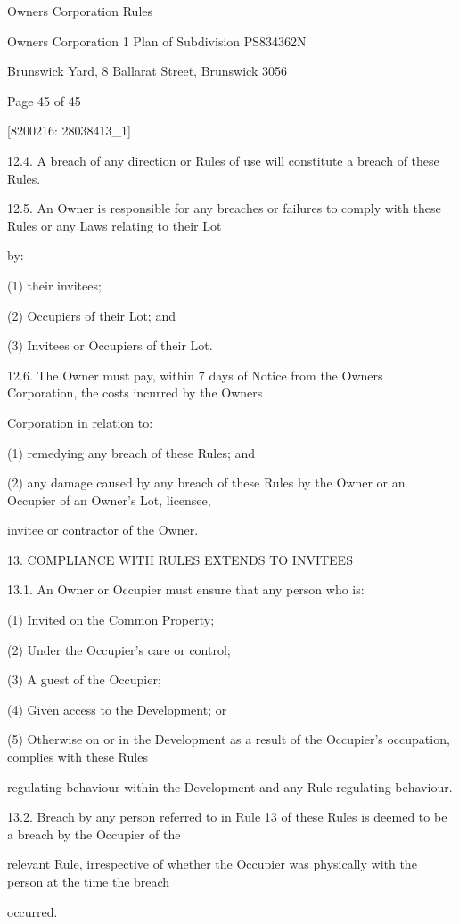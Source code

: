 \documentclass{article}
\begin{document}
{\fontsize{9}{1}Owners Corporation Rules }

{\fontsize{9}{1}Owners Corporation 1 Plan of Subdivision PS834362N }

{\fontsize{9}{1}Brunswick Yard, 8 Ballarat Street, Brunswick 3056 }


{\fontsize{9}{1}Page 45  of 45 }



{\fontsize{7.02}{1}[8200216: 28038413\_1] }

{\fontsize{9.99}{1}12.4. A breach of any direction or Rules of use will constitute a breach of these Rules. }


{\fontsize{9.99}{1}12.5. An Owner is responsible for any breaches or failures to comply with these Rules or any Laws relating to their Lot }

{\fontsize{10.02}{1}by: }

{\fontsize{9.962}{1}(1) their invitees; }

{\fontsize{9.962}{1}(2) Occupiers of their Lot; and }

{\fontsize{9.962}{1}(3) Invitees or Occupiers of their Lot. }

{\fontsize{9.99}{1}12.6. The Owner must pay, within 7 days of Notice from the Owners Corporation, the costs incurred by the Owners }

{\fontsize{10.02}{1}Corporation in relation to: }

{\fontsize{9.962}{1}(1) remedying any breach of these Rules; and }

{\fontsize{9.962}{1}(2) any damage caused by any breach of these Rules by the Owner or an Occupier of an Owner’s Lot, licensee, }

{\fontsize{10.02}{1}invitee or contractor of the Owner. }



{\fontsize{9.99}{1}13. COMPLIANCE WITH RULES EXTENDS TO INVITEES }

{\fontsize{9.99}{1}13.1. An Owner or Occupier must ensure that any person who is: }

{\fontsize{9.962}{1}(1) Invited on the Common Property; }

{\fontsize{9.962}{1}(2) Under the Occupier’s care or control; }

{\fontsize{9.962}{1}(3) A guest of the Occupier; }

{\fontsize{9.962}{1}(4) Given access to the Development; or }

{\fontsize{9.962}{1}(5) Otherwise on or in the Development as a result of the Occupier’s occupation, complies with these Rules }

{\fontsize{10.02}{1}regulating behaviour within the Development and any Rule regulating behaviour. }

{\fontsize{9.99}{1}13.2. Breach by any person referred to in Rule 13 of these Rules is deemed to be a breach by the Occupier of the }

{\fontsize{10.02}{1}relevant Rule, irrespective of whether the Occupier was physically with the person at the time the breach }

{\fontsize{10.02}{1}occurred. }
\end{document}
